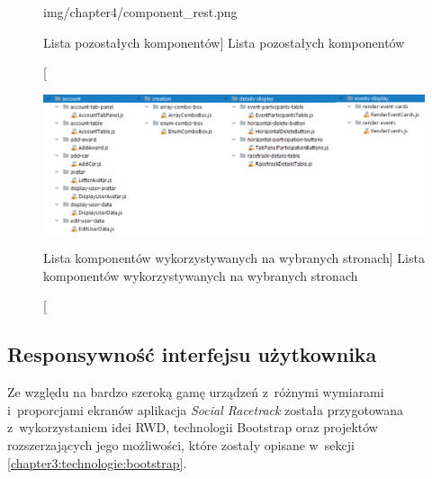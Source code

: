 \documentclass[../Kamil_Kowalewski_Main.tex]{subfiles}
\begin{document}
{{{\begin{figure}[H]
\begin{minipage}[b]{0.45\textwidth}
                    {img/chapter4/component_rest.png}
                    \caption
                    [Lista pozostałych komponentów]
                    {Lista pozostałych komponentów}
                    \label{chapter4:dok_techniczna:implementacja:struktura_komponentow:rest}
                \end{minipage}
            \end{figure}

            \begin{figure}[H]
                \centering
                \includegraphics[width=\textwidth, keepaspectratio]
                {img/chapter4/component_pages.png}
                \caption
                [Lista komponentów wykorzystywanych na wybranych stronach]
                {Lista komponentów wykorzystywanych na wybranych stronach}
                \label{chapter4:dok_techniczna:implementacja:struktura_komponentow:pages}
            \end{figure}
        }

        \subsection{Responsywność interfejsu użytkownika}
        \label{chapter4:dok_techniczna:implementacja:responsywnosc} {
            Ze względu na bardzo szeroką gamę urządzeń z~różnymi wymiarami
            i~proporcjami ekranów aplikacja \textit{Social Racetrack} została
            przygotowana z~wykorzystaniem idei RWD, technologii Bootstrap oraz
            projektów rozszerzających jego możliwości, które zostały opisane w~sekcji
            \ref{chapter3:technologie:bootstrap}.

}}}
\end{document}
